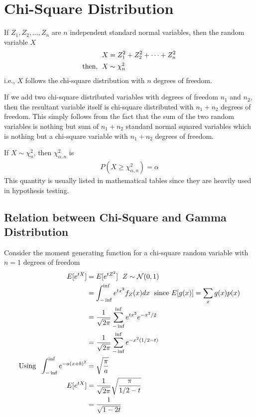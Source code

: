 \documentclass[../probability-notes.tex]{subfiles}
\begin{document}
    \section{Chi-Square Distribution}\label{chi_square}
    If $Z_{1}, Z_{2}, \ldots, Z_{n}$ are $n$ independent standard normal variables, then the random variable $X$
    \begin{align*}
        X &= Z_{1}^{2} + Z_{2}^{2} + \cdots + Z_{n}^{2}\\
        \text{then, \;} X &\sim \chi_{n}^{2} 
    \end{align*}
    i.e., $X$ follows the chi-square distribution with $n$ degrees of freedom.\newline

    If we add two chi-square distributed variables with degrees of freedom $n_{1}$ and $n_{2}$, then the resultant variable itself is chi-square distributed with $n_{1} + n_{2}$ degrees of freedom. This simply follows from the fact that the sum of the two random variables is nothing but sum of $n_{1} + n_{2}$ standard normal squared variables which is nothing but a chi-square variable with $n_{1} + n_{2}$ degrees of freedom.\newline

    If $X \sim \chi_{n}^{2}$, then $\chi_{\alpha, n}^{2}$ is
    \begin{align*}
        P(X \geq \chi_{\alpha, n}^{2}) = \alpha
    \end{align*}
    This quantity is usually listed in mathematical tables since they are heavily used in hypothesis testing.\newline

    \subsection{Relation between Chi-Square and Gamma Distribution}
    Consider the moment generating function for a chi-square random variable with $n=1$ degrees of freedom
    \begin{align*}
        E[e^{tX}] &= E[e^{tZ^{2}}] \text{\; $Z \sim \mathcal{N}(0, 1)$}\\
        &= \int_{-\inf}^{\inf} e^{tx^{2}} f_{Z}(x) dx \text{\; since $E[g(x)] = \sum_{x} g(x)p(x)$}\\
        &= \frac{1}{\sqrt{2\pi}} \sum_{-\inf}^{\inf} e^{tx^{2}} e^{-x^{2}/2}\\
        &= \frac{1}{\sqrt{2\pi}} \sum_{-\inf}^{\inf} e^{-x^{2}(1/2 - t)}\\
        \text{Using \;} \int_{-\inf}^{\inf} e^{-a(x+b)^{2}} &= \sqrt{\frac{\pi}{a}}\\
        E[e^{tX}] &= \frac{1}{\sqrt{2\pi}} \sqrt{\frac{\pi}{1/2 - t}}\\
        &= \frac{1}{\sqrt{1 - 2t}}
    \end{align*}
\end{document}
